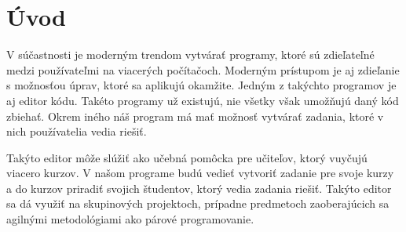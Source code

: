 \chapter*{Úvod} %

V súčastnosti je moderným trendom vytvárať programy, ktoré sú zdieľateľné medzi používateľmi na
viacerých počítačoch. Moderným prístupom je aj zdieľanie s možnosťou úprav, ktoré sa aplikujú
okamžite. Jedným z takýchto programov je aj editor kódu. Takéto programy už existujú, nie všetky
však umožňujú daný kód zbiehať. Okrem iného náš program má mať možnosť vytvárať zadania, ktoré v
nich používatelia vedia riešiť. 

Takýto editor môže slúžiť ako učebná pomôcka pre učiteľov, ktorý vuyčujú viacero kurzov. V našom
programe budú vedieť vytvoriť zadanie pre svoje kurzy a do kurzov priradiť svojich študentov, ktorý
vedia zadania riešiť. Takýto editor sa dá využiť na skupinových projektoch, prípadne predmetoch
zaoberajúcich sa agilnými metodológiami ako párové programovanie.
